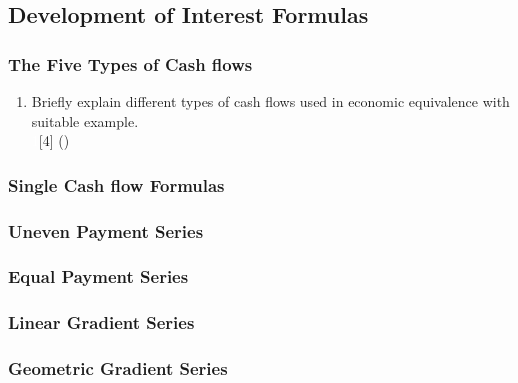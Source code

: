 \documentclass[12pt]{article}
\newcommand{\enter}{\\\textcolor{white}{1}}
\begin{document}
\subsection{Development of Interest Formulas}
\subsubsection{The Five Types of Cash flows}
\begin{enumerate}
\item Briefly explain different types of cash flows used in economic equivalence with suitable example.
\enter\hfill[4] ()
\end{enumerate}
\subsubsection{Single Cash flow Formulas}
\subsubsection{Uneven Payment Series}
\subsubsection{Equal Payment Series}
\subsubsection{Linear Gradient Series}
\subsubsection{Geometric Gradient Series}
\end{document}
